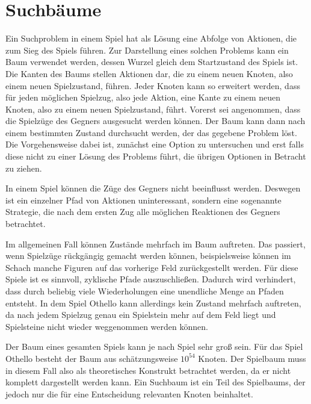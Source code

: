 \section{Suchbäume}


Ein Suchproblem in einem Spiel hat als Lösung eine Abfolge von Aktionen, die zum Sieg des Spiels führen.
Zur Darstellung eines solchen Problems kann ein Baum verwendet werden, dessen Wurzel gleich dem Startzustand des Spiels ist.
Die Kanten des Baums stellen Aktionen dar, die zu einem neuen Knoten, also einem neuen Spielzustand, führen.
Jeder Knoten kann so erweitert werden, dass für jeden möglichen Spielzug, also jede Aktion, eine Kante zu einem neuen Knoten, also zu einem neuen Spielzustand, führt.
Vorerst sei angenommen, dass die Spielzüge des Gegners ausgesucht werden können.
Der Baum kann dann nach einem bestimmten Zustand durchsucht werden, der das gegebene Problem löst.
Die Vorgehensweise dabei ist, zunächst eine Option zu untersuchen und erst falls diese nicht zu einer Lösung des Problems führt, die übrigen Optionen in Betracht zu ziehen.
\cite[S.~75]{ai2010russel}

In einem Spiel können die Züge des Gegners nicht beeinflusst werden.
Deswegen ist ein einzelner Pfad von Aktionen uninteressant, sondern eine sogenannte Strategie, die nach dem ersten Zug alle möglichen Reaktionen des Gegners betrachtet.
\cite[S.~163]{ai2010russel}

Im allgemeinen Fall können Zustände mehrfach im Baum auftreten.
Das passiert, wenn Spielzüge rückgängig gemacht werden können, beispielsweise können im Schach manche Figuren auf das vorherige Feld zurückgestellt werden.
Für diese Spiele ist es sinnvoll, zyklische Pfade auszuschließen. %
Dadurch wird verhindert, dass durch beliebig viele Wiederholungen eine unendliche Menge an Pfaden entsteht.
\cite[S.~75]{ai2010russel}
In dem Spiel Othello kann allerdings kein Zustand mehrfach auftreten, da nach jedem Spielzug genau ein Spielstein mehr auf dem Feld liegt und Spielsteine nicht wieder weggenommen werden können.

Der Baum eines gesamten Spiels kann je nach Spiel sehr groß sein.
Für das Spiel Othello besteht der Baum aus schätzungsweise $10^{54}$ Knoten. %
Der Spielbaum muss in diesem Fall also als theoretisches Konstrukt betrachtet werden, da er nicht komplett dargestellt werden kann.
Ein Suchbaum ist ein Teil des Spielbaums, der jedoch nur die für eine Entscheidung relevanten Knoten beinhaltet.
\cite[S.~162f.]{ai2010russel}
